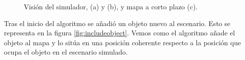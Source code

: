\begin{figure}[H]
  \begin{center}
  \end{center}
  \caption{Visión del simulador, (a) y (b), y mapa a corto plazo (c).}
  \label{fig:initserver}
\end{figure}

Tras el inicio del algoritmo se añadió un objeto nuevo al escenario. Esto se representa en la figura \ref{fig:includeobject}. Vemos como el algoritmo añade el objeto al mapa y lo sitúa en una posición coherente respecto a la posición que ocupa el objeto en el escenario simulado.

